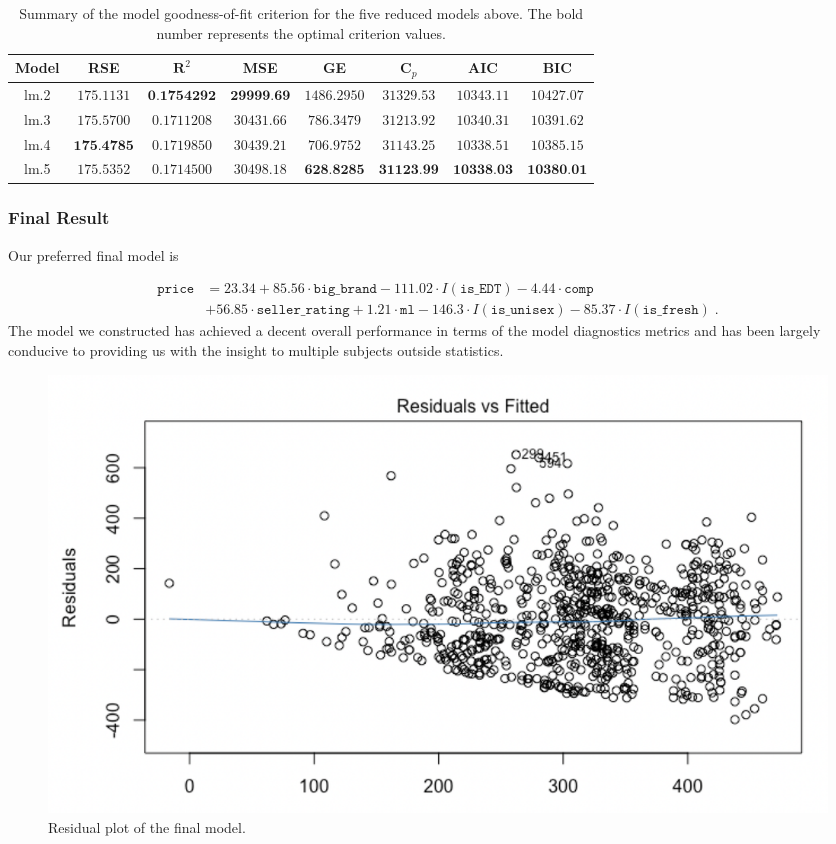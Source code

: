 \documentclass[12pt]{amsart}
\begin{document}
\begin{table}[H]
    \centering
    \renewcommand{\arraystretch}{1.2}
        \begin{tabular}{ c c c c c c c c}
            \hline
             \textbf{Model} & \textbf{RSE} & $\boldsymbol{R}^2$ & \textbf{MSE} & \textbf{GE} & $\boldsymbol{C}_p$ & \textbf{AIC} & \textbf{BIC}  \\ \hline
             lm.2 & $175.1131$ & $\textbf{0.1754292}$ & $\textbf{29999.69}$ & $1486.2950$ & $31329.53$ & $10343.11$ & $10427.07$ \\
             lm.3 & $175.5700$ & $0.1711208$ & $30431.66$ & $786.3479$ & $31213.92$ & $10340.31$ & $10391.62$ \\
             lm.4 & $\textbf{175.4785}$ & $0.1719850$ & $30439.21$ & $706.9752$ & $31143.25$ & $10338.51$ & $10385.15$ \\
             lm.5 & $175.5352$ & $0.1714500$ & $30498.18$ & $\textbf{628.8285}$ & $\textbf{31123.99}$ & $\textbf{10338.03}$ & $\textbf{10380.01}$ \\ \hline
        \end{tabular}
 \vspace{10pt}
 \caption{Summary of the model goodness-of-fit criterion for the five reduced models above. The bold number represents the optimal criterion values.}
\label{tab4}
\end{table}

\subsubsection{Final Result}

Our preferred final model is

\begin{align*}
    \texttt{price} &= 23.34 + 85.56 \cdot \texttt{big\_brand} - 111.02 \cdot I(\texttt{is\_EDT}) - 4.44 \cdot \texttt{comp} \\
    & + 56.85\cdot \texttt{seller\_rating}+ 1.21\cdot \texttt{ml}
- 146.3\cdot I(\texttt{is\_unisex}) 
- 85.37\cdot I(\texttt{is\_fresh}) \;.
\end{align*}
The model we constructed has achieved a decent overall performance in terms of the 
model diagnostics metrics and has been largely conducive to providing us with the insight to 
multiple subjects outside statistics.

\begin{figure}[H]
    \centering
    \includegraphics[width = 0.8\linewidth]{423Residual.png}
    \caption{Residual plot of the final model.}
    \label{residual}
\end{figure}
\end{document}
